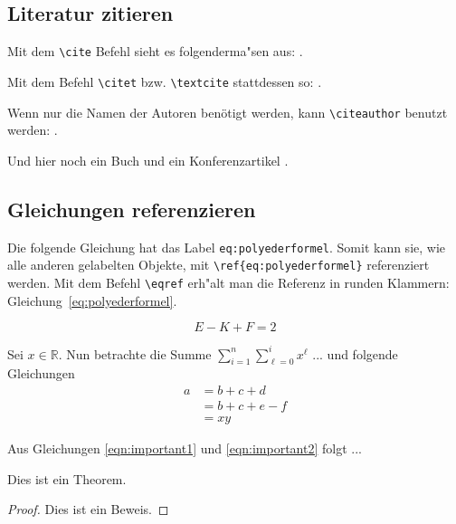 \pagebreak

\subsection{Literatur zitieren}

Mit dem \texttt{\textbackslash{}cite} Befehl sieht es folgenderma"sen aus:
\cite{Lehnfeld2014}.

Mit dem Befehl \texttt{\textbackslash{}citet} bzw. \texttt{\textbackslash{}textcite} stattdessen so:
\textcite{Lehnfeld2014}.

Wenn nur die Namen der Autoren benötigt werden, kann
\texttt{\textbackslash{}citeauthor} benutzt werden: \citeauthor{Lehnfeld2014}.

Und hier noch ein Buch \cite{Brucker2007} und ein Konferenzartikel
\cite{Huang2010}.

\subsection{Gleichungen referenzieren}
\label{sec:gleichungen-referenzieren}

Die folgende Gleichung hat das Label \texttt{eq:polyederformel}.
Somit kann sie, wie alle anderen gelabelten Objekte, mit
\texttt{\textbackslash{}ref\{eq:polyederformel\}}
referenziert werden.
Mit dem Befehl \texttt{\textbackslash{}eqref}
erh"alt man die Referenz in runden Klammern:
Gleichung~\eqref{eq:polyederformel}.

\begin{equation}
  \label{eq:polyederformel}
  E - K + F = 2
\end{equation}

Sei $x \in \mathbb{R}$. Nun betrachte die Summe $\sum_{i=1}^n \sum_{\ell = 0}^{i} x^\ell$ ... und folgende Gleichungen
\begin{align}
a &= b + c + d      \label{eqn:important1} \\
  &= b + c + e - f  \nonumber \\
  &= xy             \label{eqn:important2}
\end{align}

Aus Gleichungen \eqref{eqn:important1} und \eqref{eqn:important2} folgt ...

\begin{mytheorem}
	Dies ist ein Theorem.
\end{mytheorem}
\begin{proof}
	Dies ist ein Beweis.
\end{proof}

